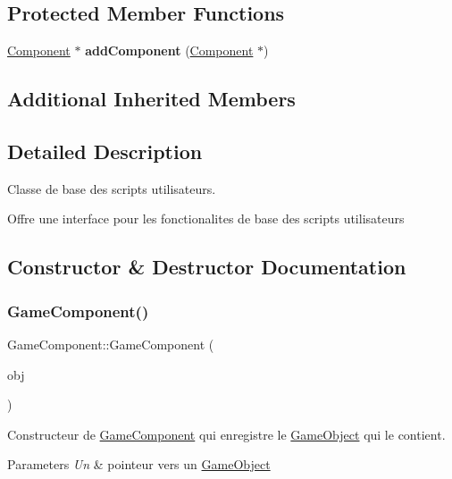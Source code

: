 \subsection*{Protected Member Functions}
\begin{DoxyCompactItemize}
\item 
\hypertarget{class_game_component_abeecc14e2cd29b7ec83d74aabfe4403b}{}\label{class_game_component_abeecc14e2cd29b7ec83d74aabfe4403b} 
\hyperlink{class_component}{Component} $\ast$ {\bfseries add\+Component} (\hyperlink{class_component}{Component} $\ast$)
\end{DoxyCompactItemize}
\subsection*{Additional Inherited Members}


\subsection{Detailed Description}
Classe de base des scripts utilisateurs. 

Offre une interface pour les fonctionalites de base des scripts utilisateurs 

\subsection{Constructor \& Destructor Documentation}
\hypertarget{class_game_component_a7d6d7a04c69a2eb0aa2d367925b501a2}{}\label{class_game_component_a7d6d7a04c69a2eb0aa2d367925b501a2} 
\subsubsection{\texorpdfstring{Game\+Component()}{GameComponent()}}
{\footnotesize\ttfamily Game\+Component\+::\+Game\+Component (\begin{DoxyParamCaption}\item[{\hyperlink{class_game_object}{Game\+Object} $\ast$}]{obj }\end{DoxyParamCaption})}



Constructeur de \hyperlink{class_game_component}{Game\+Component} qui enregistre le \hyperlink{class_game_object}{Game\+Object} qui le contient. 


\begin{DoxyParams}{Parameters}
{\em Un} & pointeur vers un \hyperlink{class_game_object}{Game\+Object} \\
\hline
\end{DoxyParams}



